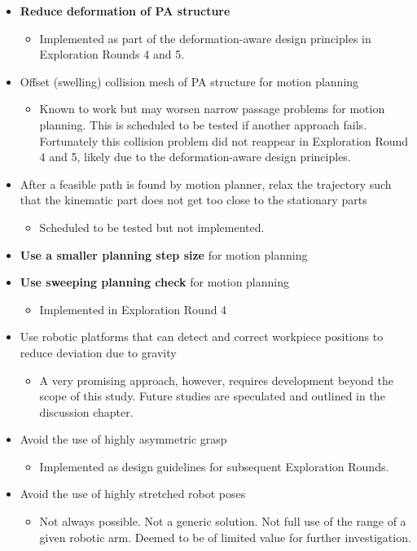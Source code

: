 \begin{itemize}
    \item \textbf{Reduce deformation of PA structure}
    \begin{itemize}
        \item Implemented as part of the deformation-aware design principles in Exploration Rounds 4 and 5. 
    \end{itemize}
    \item Offset (swelling) collision mesh of PA structure for motion planning
    \begin{itemize}
        \item Known to work but may worsen narrow passage problems for motion planning. This is scheduled to be tested if another approach fails. Fortunately this collision problem did not reappear in Exploration Round 4 and 5, likely due to the deformation-aware design principles.
    \end{itemize}
    \item After a feasible path is found by motion planner, relax the trajectory such that the kinematic part does not get too close to the stationary parts
    \begin{itemize}
        \item Scheduled to be tested but not implemented.
    \end{itemize}
    \item \textbf{Use a smaller planning step size} for motion planning
    \item \textbf{Use sweeping planning check} for motion planning
    \begin{itemize}
        \item Implemented in Exploration Round 4
    \end{itemize}
    \item Use robotic platforms that can detect and correct workpiece positions to reduce deviation due to gravity
    \begin{itemize}
        \item A very promising approach, however, requires development beyond the scope of this study. Future studies are speculated and outlined in the discussion chapter. 
    \end{itemize}
    \item Avoid the use of highly asymmetric grasp
    \begin{itemize}
        \item Implemented as design guidelines for subsequent Exploration Rounds.
    \end{itemize}
    \item Avoid the use of highly stretched robot poses
    \begin{itemize}
        \item Not always possible. Not a generic solution. Not full use of the range of a given robotic arm. Deemed to be of limited value for further investigation.
    \end{itemize}
\end{itemize}

